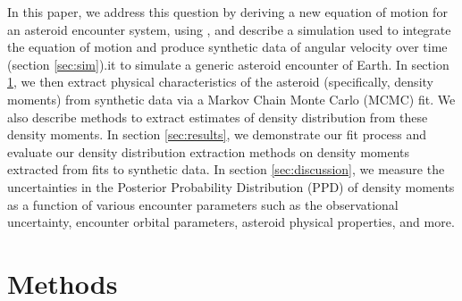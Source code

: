 \documentclass[fleqn,usenatbib]{mnras}
\begin{document}
In this paper, we address this question by deriving a new equation of motion for an asteroid encounter system, using , and describe a simulation used to integrate the equation of motion and produce synthetic data of angular velocity over time (section \ref{sec:sim}).it to simulate a generic asteroid encounter of Earth. In section  \ref{sec:methods}, we then extract physical characteristics of the asteroid (specifically, density moments) from synthetic data via a Markov Chain Monte Carlo (MCMC) fit. We also describe methods to extract estimates of density distribution from these density moments. In section \ref{sec:results}, we demonstrate our fit process and evaluate our density distribution extraction methods on density moments extracted from fits to synthetic data. In section \ref{sec:discussion}, we measure the uncertainties in the Posterior Probability Distribution (PPD) of density moments as a function of various encounter parameters such as the observational uncertainty, encounter orbital parameters, asteroid physical properties, and more.

\section{Methods}
\label{sec:methods}
\end{document}
